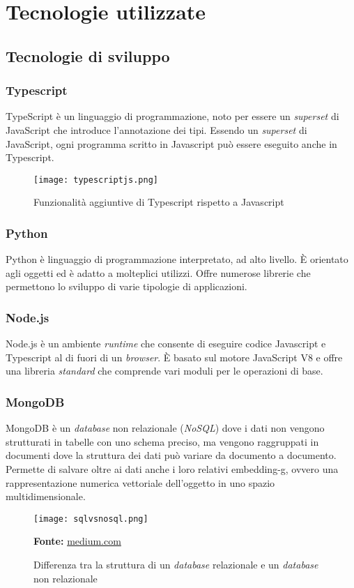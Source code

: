 \section{Tecnologie utilizzate} \label{sec:tecnologie}
\subsection{Tecnologie di sviluppo}
\subsubsection{Typescript}
TypeScript è un linguaggio di programmazione, noto per essere un \textit{superset} di JavaScript che introduce l'annotazione dei tipi. Essendo un \textit{superset} di JavaScript, ogni programma scritto in Javascript può essere eseguito anche in Typescript.
\begin{figure}[H]
    \centering
    \texttt{[image: typescriptjs.png]}
    \caption{Funzionalità aggiuntive di Typescript rispetto a Javascript}
    \label{fig:Typescript}
\end{figure}
\subsubsection{Python}
Python è linguaggio di programmazione interpretato, ad alto livello. È orientato agli oggetti ed è adatto a molteplici utilizzi. Offre numerose librerie che permettono lo sviluppo di varie tipologie di applicazioni. 
\subsubsection{Node.js}
Node.js è un ambiente \textit{runtime} che consente di eseguire codice Javascript e Typescript al di fuori di un \textit{browser}. È basato sul motore JavaScript V8 e offre una libreria \textit{standard} che comprende vari moduli per le operazioni di base. 
\subsubsection{MongoDB}
MongoDB è un \textit{database} non relazionale (\textit{NoSQL}) dove i dati non vengono strutturati in tabelle con uno schema preciso, ma vengono raggruppati in documenti dove la struttura dei dati può variare da documento a documento. Permette di salvare oltre ai dati anche i loro relativi \gls{embedding-g}, ovvero una rappresentazione numerica vettoriale dell'oggetto in uno spazio multidimensionale.
\begin{figure}[H]
    \centering
    \texttt{[image: sqlvsnosql.png]}
    \caption{Differenza tra la struttura di un \textit{database} relazionale e un \textit{database} non relazionale}
    \small \textbf{Fonte:} \href{https://naveen-metta.medium.com/decoding-the-database-dilemma-sql-vs-nosql-in-system-design-8666e21f4a58c}{medium.com}
    \label{fig:sql-vs-nosql}
\end{figure} 


